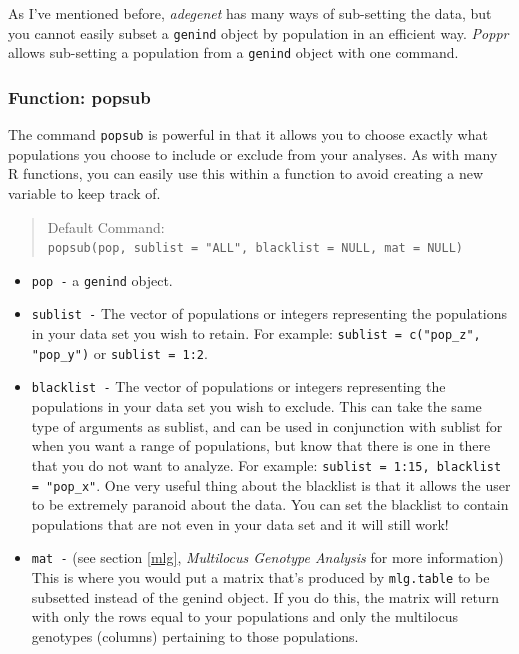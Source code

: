 \documentclass[letterpaper]{article}
\newcommand{\tab}{\hspace*{1em}}
\begin{document}
\tab\tab As I've mentioned before, \textit{adegenet} has many ways of sub-setting the data, but you cannot easily subset a \texttt{genind} object by population in an efficient way. \textit{Poppr} allows sub-setting a population from a \texttt{genind} object with one command.
\subsubsection{Function: popsub}\label{data.manip:divide:popsub}

\tab\tab The command \texttt{popsub} is powerful in that it allows you to choose exactly what populations you choose to include or exclude from your analyses. As with many R functions, you can easily use this within a function to avoid creating a new variable to keep track of.  
\begin{quote}
Default Command:\\
\texttt{popsub(pop, sublist = "ALL", blacklist = NULL, mat = NULL)}
\end{quote}
\begin{itemize}
  \item \texttt{pop -} a \texttt{genind} object.
  \item \texttt{sublist -} The vector of populations or integers representing the populations in your data set you wish to retain. For example: \texttt{sublist = c("pop\_z", "pop\_y")} or \texttt{sublist = 1:2}.
  \item \texttt{blacklist -} The vector of populations or integers representing the populations in your data set you wish to exclude. This can take the same type of arguments as sublist, and can be used in conjunction with sublist for when you want a range of populations, but know that there is one in there that you do not want to analyze. For example: \texttt{sublist = 1:15, blacklist = "pop\_x"}.
  One very useful thing about the blacklist is that it allows the user to be extremely paranoid about the data. You can set the blacklist to contain populations that are not even in your data set and it will still work!
  \item \texttt{mat -} (see section \ref{mlg}, \textit{Multilocus Genotype Analysis} for more information) This is where you would put a matrix that's produced by \texttt{mlg.table} to be subsetted instead of the genind object. If you do this, the matrix will return with only the rows equal to your populations and only the multilocus genotypes (columns) pertaining to those populations. 
\end{itemize}
\end{document}
